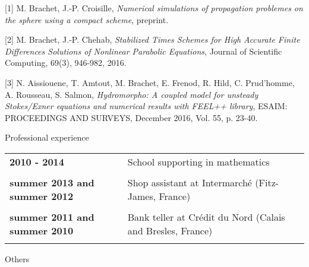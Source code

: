 \documentclass[10pt,a4paper]{report}
\begin{document}
[1] {\sc  M. Brachet, J.-P. Croisille}, {\sl Numerical simulations of propagation problemes on the sphere using a compact scheme}, preprint.

\vspace{0.6cm}

[2] {\sc M. Brachet, J.-P. Chehab}, {\sl Stabilized Times Schemes for High Accurate Finite Differences Solutions of Nonlinear Parabolic Equations}, Journal of Scientific Computing, 69(3), 946-982, 2016.

\vspace{0.6cm}

[3] {\sc  N. Aissiouene, T. Amtout, M. Brachet, E. Frenod, R. Hild, C. Prud'homme, A. Rousseau, S. Salmon}, {\sl  Hydromorpho: A coupled model for unsteady Stokes/Exner equations and numerical results with FEEL++ library}, ESAIM: PROCEEDINGS AND SURVEYS, December 2016, Vol. 55, p. 23-40.






\vspace{1cm}
\noindent
{\selectfont
\begin{Large}
Professional experience
\end{Large}
\hrulefill
}

\vspace{0.6cm}
\noindent
\begin{center}
\begin{tabular}{p{5cm} p{10cm}}
\textbf{2010 - 2014} & School supporting in mathematics\\

& \\

\textbf{summer 2013 and summer 2012} & Shop assistant at Intermarché (Fitz-James, France) \\

& \\

\textbf{summer 2011 and summer 2010} & Bank teller at Crédit du Nord (Calais and Bresles, France) \\

& \\

\end{tabular}
\end{center}


\vspace{0.6cm}
\noindent
{\selectfont
\begin{Large}
Others
\end{Large}
\hrulefill
}
\end{document}
